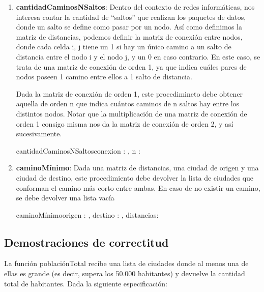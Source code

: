 \documentclass[10pt,a4paper]{article}
\begin{document}
\begin{enumerate}
        \item \textbf{cantidadCaminosNSaltos}: Dentro del contexto de redes inform\'aticas, nos interesa contar la cantidad de “saltos”
        que realizan los paquetes de datos, donde un salto se define como pasar por un nodo.
        As\'i como definimos la matriz de distancias, podemos definir la matriz de conexi\'on entre nodos, donde cada celda i, j
        tiene un 1 si hay un  \'unico camino a un salto de distancia entre el nodo i y el nodo j, y un 0 en caso contrario. En este
        caso, se trata de una matriz de conexi\'on de orden 1, ya que indica cu\'ales pares de nodos poseen 1 camino entre ellos a
        1 salto de distancia.

        Dada la matriz de conexi\'on de orden 1, este procedimineto debe obtener aquella de orden n que indica cu\'antos caminos
        de n saltos hay entre los distintos nodos. Notar que la multiplicaci\'on de una matriz de conexi\'on de orden 1 consigo
        misma nos da la matriz de conexi\'on de orden 2, y as\'i sucesivamente.

        \begin{proc}{cantidadCaminosNSaltos}{\Inout conexion : \TLista{\TLista{\ent}}, \In n : \ent}{}\end{proc}

        \item \textbf{caminoM\'inimo}: Dada una matriz de distancias, una ciudad de origen y una ciudad de destino, este procedimiento
        debe devolver la lista de ciudades que conforman el camino m\'as corto entre ambas. En caso de no existir un camino,
        se debe devolver una lista vac\'ia

        \begin{proc}{caminoM\'inimo}{\In origen : \ent, \In destino : \ent, \In distancias: \TLista{\TLista{\ent}}}{\TLista{\ent}}
        \end{proc}
    \end{enumerate}

\subsection{Demostraciones de correctitud}

La funci\'on poblaci\'onTotal recibe una lista de ciudades donde al menos una de ellas es grande (es decir, supera los
50.000 habitantes) y devuelve la cantidad total de habitantes. Dada la siguiente especificaci\'on:
\end{document}

